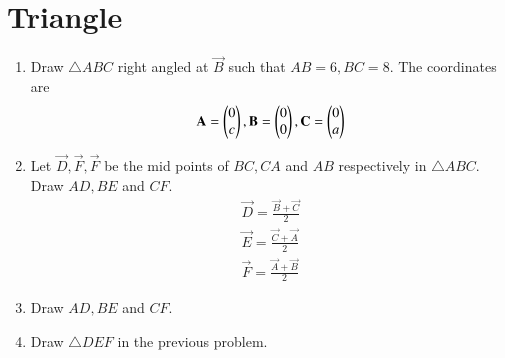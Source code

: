 \documentclass[journal,12pt,twocolumn]{IEEEtran}
\renewcommand\thesection{\arabic{section}}
\begin{document}
\section{Triangle}
\begin{enumerate}[label=\thesection.\arabic*
,ref=\thesection.\theenumi]
%
\item Draw $\triangle ABC$  right angled at $\vec{B}$ such that $AB = 6, BC =8$.
\solution The coordinates are
\begin{align}
\label{eq:rt_tang_pair}
\mathbf{A}=\begin{pmatrix}0 \\ c\end{pmatrix}
,
\mathbf{B}=\begin{pmatrix}0 \\ 0\end{pmatrix}
,
\mathbf{C}=\begin{pmatrix}0 \\ a\end{pmatrix}
\end{align}
\item Let $\vec{D}, \vec{F}, \vec{F}$ be the mid points of $BC,CA$ and $AB$ respectively in $\triangle ABC$. Draw $AD,BE$ and $CF$.
\\
\solution 
\begin{align}
\label{eq:rt_tang_pair}
\vec{D} = \frac{\vec{B}+\vec{C}}{2}
\\
\vec{E} = \frac{\vec{C}+\vec{A}}{2}
\\
\vec{F} = \frac{\vec{A}+\vec{B}}{2}
\end{align}
\item  Draw $AD, BE$ and $CF$.
\item Draw $\triangle DEF$ in the previous problem.

\end{enumerate}
\end{document}
